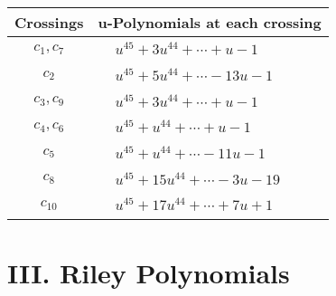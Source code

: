 \documentclass[1p]{elsarticle_modified}
\theoremstyle{definition}
\begin{document}
\begin{tabular}{m{50pt}|m{274pt}}
Crossings & \hspace{64pt}u-Polynomials at each crossing \\
\hline $$\begin{aligned}c_{1},c_{7}\end{aligned}$$&$\begin{aligned}
&u^{45}+3 u^{44}+\cdots+u-1
\end{aligned}$\\
\hline $$\begin{aligned}c_{2}\end{aligned}$$&$\begin{aligned}
&u^{45}+5 u^{44}+\cdots-13 u-1
\end{aligned}$\\
\hline $$\begin{aligned}c_{3},c_{9}\end{aligned}$$&$\begin{aligned}
&u^{45}+3 u^{44}+\cdots+u-1
\end{aligned}$\\
\hline $$\begin{aligned}c_{4},c_{6}\end{aligned}$$&$\begin{aligned}
&u^{45}+u^{44}+\cdots+u-1
\end{aligned}$\\
\hline $$\begin{aligned}c_{5}\end{aligned}$$&$\begin{aligned}
&u^{45}+u^{44}+\cdots-11 u-1
\end{aligned}$\\
\hline $$\begin{aligned}c_{8}\end{aligned}$$&$\begin{aligned}
&u^{45}+15 u^{44}+\cdots-3 u-19
\end{aligned}$\\
\hline $$\begin{aligned}c_{10}\end{aligned}$$&$\begin{aligned}
&u^{45}+17 u^{44}+\cdots+7 u+1
\end{aligned}$\\
\hline
\end{tabular}\newpage\renewcommand{\arraystretch}{1}
\centering \section*{ III. Riley Polynomials}
\end{document}
